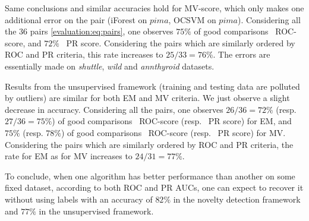 Same conclusions and similar accuracies hold for MV-score, which only makes one additional error on the pair (iForest on $pima$, OCSVM on $pima$).
%
Considering all the 36 pairs \eqref{evaluation:eq:pairs}, %
one observes $75\%$ of good comparisons \wrt~ROC-score, and $72\%$ \wrt~PR score.
Considering the pairs which are similarly ordered by ROC and PR criteria, this rate increases to $25/33 = 76\%$. The errors are essentially made on \emph{shuttle}, \emph{wild} and \emph{annthyroid} datasets. 

Results from the unsupervised framework (training and testing data are polluted by outliers) are similar for both EM and MV criteria. We just observe a slight decrease in accuracy.
Considering all the pairs, one observes $26/36 = 72\%$ (resp. $27/36 = 75\%$) of good comparisons \wrt~ROC-score (resp. \wrt~PR score) for EM, and $75\%$ (resp. $78\%$) of good comparisons \wrt~ROC-score (resp. \wrt~PR score) for MV.
Considering the pairs which are similarly ordered by ROC and PR criteria, the rate for EM as for MV increases to $24/31 = 77\%$.

To conclude, when one algorithm has %
better performance than another on some fixed dataset, according to both ROC and PR AUCs, one can expect to recover it without using labels with an accuracy of $82\%$ in the novelty detection framework and $77\%$ in the unsupervised framework.



